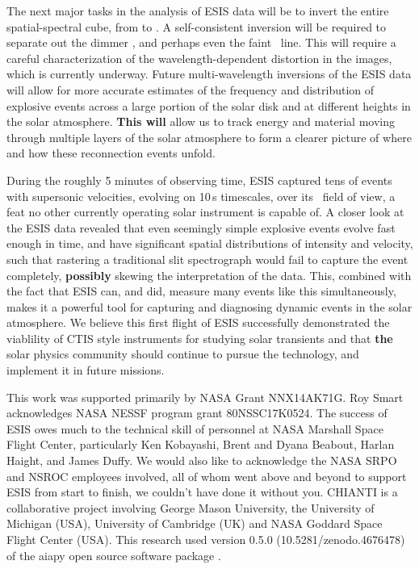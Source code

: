 \documentclass[linenumbers,trackchanges]{aastex63}
\begin{document}
	The next major tasks in the analysis of ESIS data will be to invert the entire spatial-spectral cube, from  to . 
	A self-consistent inversion will be required to separate out the dimmer \mgxdim, and perhaps even the faint \oiii \ line. This will require a careful characterization of the wavelength-dependent distortion in the images, which is currently underway.
	Future multi-wavelength inversions of the ESIS data will allow for more accurate estimates of the frequency and distribution of explosive events across a large portion of the solar disk and at different heights in the solar atmosphere. 
	\textbf{This will} allow us to track energy and material moving through multiple layers of the solar atmosphere to form a clearer picture of where and how these reconnection events unfold. 
	
	During the roughly 5 minutes of observing time, ESIS captured tens of events with supersonic velocities, evolving on 10\,s timescales, over its \esisfov \ field of view, a feat no other currently operating solar instrument is capable of.
	A closer look at the ESIS data revealed that even seemingly simple explosive events evolve fast enough in time, and have significant spatial distributions of intensity and velocity, such that rastering a traditional slit spectrograph would fail to capture the event completely, \textbf{possibly} skewing the interpretation of the data. 
	This, combined with the fact that ESIS can, and did, measure many events like this simultaneously, makes it a powerful tool for capturing and diagnosing dynamic events in the solar atmosphere.
	We believe this first flight of ESIS successfully demonstrated the viablility of CTIS style instruments for studying solar transients and that \textbf{the} solar physics community should continue to pursue the technology, and implement it in future missions. 
	
	
	

	  

     \acknowledgements
    	This work was supported primarily by NASA Grant NNX14AK71G.
	Roy Smart acknowledges NASA NESSF program grant 80NSSC17K0524. The success of ESIS owes much to the  technical skill of personnel at NASA Marshall Space Flight Center, particularly Ken Kobayashi, Brent and Dyana Beabout, Harlan Haight, and James Duffy.
	We would also like to acknowledge the NASA SRPO and NSROC employees involved, all of whom went above and beyond to support ESIS from start to finish, we couldn't have done it without you. 
	CHIANTI is a collaborative project involving George Mason University, the University of Michigan (USA), University of Cambridge (UK) and NASA Goddard Space Flight Center (USA).
	This research used version 0.5.0 (10.5281/zenodo.4676478) of the aiapy open source software package \citep{aiapy}.
    	
\end{document}
